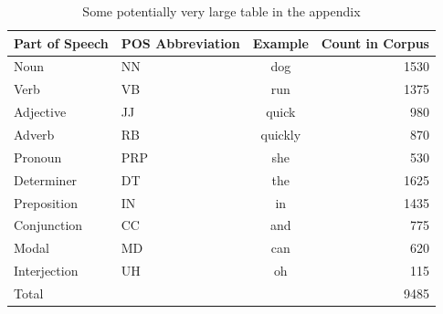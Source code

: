 \documentclass[../CLthesis.tex]{subfiles}
\begin{document}
\begin{table}[htbp]
	\centering
	\begin{tabular}{llcr}
		\toprule
		Part of Speech & POS Abbreviation & Example & Count in Corpus \\
		\midrule
		Noun           & NN               & dog     & 1530           \\
		Verb           & VB               & run     & 1375           \\
		Adjective      & JJ               & quick   & 980            \\
		Adverb         & RB               & quickly & 870            \\
		Pronoun        & PRP              & she     & 530            \\
		Determiner     & DT               & the     & 1625           \\
		Preposition    & IN               & in      & 1435           \\
		Conjunction    & CC               & and     & 775            \\
		Modal          & MD               & can     & 620            \\
		Interjection   & UH               & oh      & 115            \\
		\midrule
		Total          &                  &         & 9485           \\
		\bottomrule
	\end{tabular}
	

	\caption[An Additional Table]{Some potentially very large table in the appendix}%
	\label{tab:appendix_postags3}
\end{table}
\end{document}
